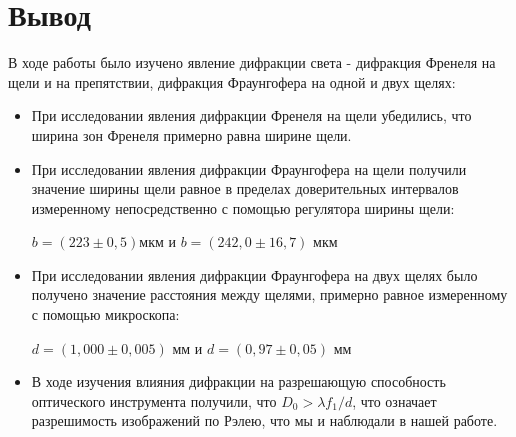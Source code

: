 \documentclass[a4paper,12pt]{extarticle}
\begin{document}
\section*{Вывод}
В ходе работы было изучено явление дифракции света - дифракция Френеля на щели и на препятствии, дифракция Фраунгофера на одной и двух щелях:
\begin{itemize}
\item При исследовании явления дифракции Френеля на щели убедились, что ширина зон Френеля примерно равна ширине щели.
\item При исследовании явления дифракции Фраунгофера на щели получили значение ширины щели равное в пределах доверительных интервалов измеренному непосредственно с помощью регулятора ширины щели:
\begin{center}
    $b = (223 \pm 0,5) $мкм \hspace{0.5cm} и \hspace{0.5cm} $b = (242,0 \pm 16,7)$ мкм
\end{center}
\item При исследовании явления дифракции Фраунгофера на двух щелях было получено значение расстояния между щелями, примерно равное измеренному с помощью микроскопа:
\begin{center}
    $d = (1,000 \pm 0,005)$ мм \hspace{0.5cm} и \hspace{0.5cm}  $d = (0,97 \pm 0,05)$ мм
\end{center}
\item В ходе изучения влияния дифракции на разрешающую способность оптического инструмента получили, что $D_0 > \lambda f_1/d$, что означает разрешимость изображений по Рэлею, что мы и наблюдали в нашей работе.
\end{itemize}
\end{document}
